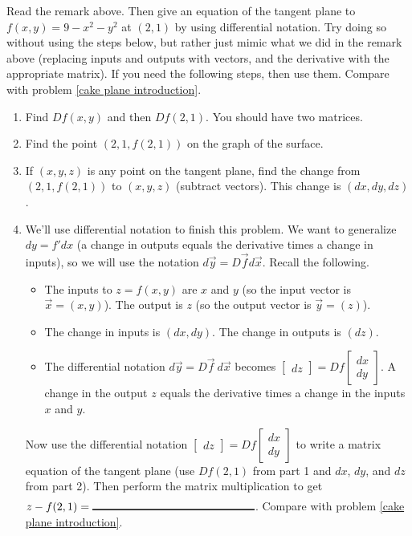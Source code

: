 \begin{problem}\label{tangent plane using matrix}%
Read the remark above. Then give an equation of the tangent plane to $f(x,y)=9-x^2-y^2$ at $(2,1)$ by using differential notation. Try doing so without using the steps below, but rather just mimic what we did in the remark above (replacing inputs and outputs with vectors, and the derivative with the appropriate matrix). If you need the following steps, then use them. Compare with problem \ref{cake plane introduction}.
\begin{enumerate}
 \item Find $Df(x,y)$ and then $Df(2,1)$. You should have two matrices.
 \item Find the point $(2,1,f(2,1))$ on the graph of the surface.
 \item If $(x,y,z)$ is any point on the tangent plane, find the change from $(2,1, f(2,1))$ to $(x,y,z)$ (subtract vectors).  This change is $(dx,dy,dz)$.
 \item We'll use differential notation to finish this problem. We want to generalize $dy=f'dx$ (a change in outputs equals the derivative times a change in inputs), so we will use the notation $d\vec y = D\vec fd\vec x$. Recall the following. 
\begin{itemize} 
\item  The inputs to $z=f(x,y)$ are $x$ and $y$ (so the input vector is $\vec x=(x,y)$).  The output is $z$ (so the output vector is $\vec y= (z)$). 
\item The change in inputs is $(dx,dy)$.  The change in outputs is $(dz)$. 
\item The differential notation $d\vec y=D\vec f\ d\vec x$ becomes $\begin{bmatrix}dz\end{bmatrix}=Df\begin{bmatrix}dx \\ dy\end{bmatrix}$. A change in the output $z$ equals the derivative times a change in the inputs $x$ and $y$.
\end{itemize}
Now use the differential notation $\begin{bmatrix}dz\end{bmatrix}=Df\begin{bmatrix}dx \\ dy\end{bmatrix}$ to write a matrix equation of the tangent plane (use $Df(2,1)$ from part 1 and $dx$, $dy$, and $dz$ from part 2). Then perform the matrix multiplication to get $z-f(2,1)=\blank{2in}$. Compare with problem \ref{cake plane introduction}.
\end{enumerate}
\end{problem}

